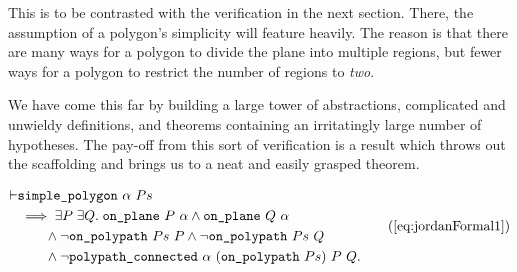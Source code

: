 This is to be contrasted with the verification in the next section. There, the assumption of a polygon's simplicity will feature heavily. The reason is that there are many ways for a polygon to divide the plane into multiple regions, but fewer ways for a polygon to restrict the number of regions to \emph{two}.

We have come this far by building a large tower of abstractions, complicated and unwieldy definitions, and theorems containing an irritatingly large number of hypotheses. The pay-off from this sort of verification is a result which throws out the scaffolding and brings us to a neat and easily grasped theorem.

\begin{equation}
  \begin{split}
    \vdash&\code{simple\_polygon}\ \alpha\ Ps\\
    &\implies \exists P\;\exists Q.\; \code{on\_plane}\ P\ \alpha \wedge \code{on\_plane}\ Q\ \alpha\\
    &\qquad\wedge \neg\code{on\_polypath}\ Ps\ P \wedge \neg\code{on\_polypath}\ Ps\ Q\\
    &\qquad\wedge \neg\code{polypath\_connected}\ \alpha\ (\code{on\_polypath}\ Ps)\ P\ Q.
  \end{split}\tag{\ref{eq:jordanFormal1}}
\end{equation}

